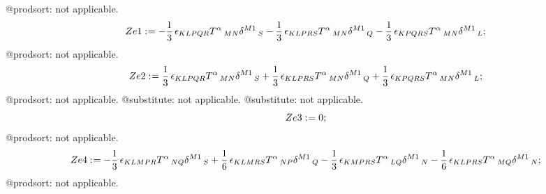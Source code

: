\documentclass[11pt]{article}
\def\specialcolon{\mathrel{\mathop{:}}\hspace{-.5em}}
\begin{document}
@prodsort: not applicable.
\begin{dmath*}[compact, spread=2pt]
Ze1\specialcolon{}=  - \frac{1}{3}\, {\epsilon}_{K L P Q R} {T}^{\alpha}\,_{M N} {\delta}^{M1}\,_{S} - \frac{1}{3}\, {\epsilon}_{K L P R S} {T}^{\alpha}\,_{M N} {\delta}^{M1}\,_{Q} - \frac{1}{3}\, {\epsilon}_{K P Q R S} {T}^{\alpha}\,_{M N} {\delta}^{M1}\,_{L};
\end{dmath*}
@prodsort: not applicable.
\begin{dmath*}[compact, spread=2pt]
Ze2\specialcolon{}= \frac{1}{3}\, {\epsilon}_{K L P Q R} {T}^{\alpha}\,_{M N} {\delta}^{M1}\,_{S} + \frac{1}{3}\, {\epsilon}_{K L P R S} {T}^{\alpha}\,_{M N} {\delta}^{M1}\,_{Q} + \frac{1}{3}\, {\epsilon}_{K P Q R S} {T}^{\alpha}\,_{M N} {\delta}^{M1}\,_{L};
\end{dmath*}
@prodsort: not applicable.
@substitute: not applicable.
@substitute: not applicable.
\begin{dmath*}[compact, spread=2pt]
Ze3\specialcolon{}= 0;
\end{dmath*}
@prodsort: not applicable.
\begin{dmath*}[compact, spread=2pt]
Ze4\specialcolon{}=  - \frac{1}{3}\, {\epsilon}_{K L M P R} {T}^{\alpha}\,_{N Q} {\delta}^{M1}\,_{S} + \frac{1}{6}\, {\epsilon}_{K L M R S} {T}^{\alpha}\,_{N P} {\delta}^{M1}\,_{Q} - \frac{1}{3}\, {\epsilon}_{K M P R S} {T}^{\alpha}\,_{L Q} {\delta}^{M1}\,_{N} - \frac{1}{6}\, {\epsilon}_{K L P R S} {T}^{\alpha}\,_{M Q} {\delta}^{M1}\,_{N};
\end{dmath*}
@prodsort: not applicable.
\end{document}
